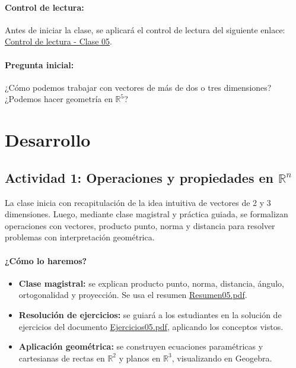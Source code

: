 \documentclass[a4,11pt]{aleph-notas}
\begin{document}
\paragraph{Control de lectura:}
Antes de iniciar la clase, se aplicará el control de lectura del siguiente enlace:
\href{https://gemini.google.com/share/240a32bed915}{Control de lectura - Clase 05}.

\paragraph{Pregunta inicial:}
¿Cómo podemos trabajar con vectores de más de dos o tres dimensiones? ¿Podemos hacer geometría en $\mathbb{R}^5$?

\section*{Desarrollo}

\subsection*{Actividad 1: Operaciones y propiedades en $\mathbb{R}^n$}

La clase inicia con recapitulación de la idea intuitiva de vectores de 2 y 3 dimensiones. Luego, mediante clase magistral y práctica guiada, se formalizan operaciones con vectores, producto punto, norma y distancia para resolver problemas con interpretación geométrica.

\paragraph{¿Cómo lo haremos?}
\begin{itemize}[leftmargin=*]
    \item \textbf{Clase magistral:} se explican producto punto, norma, distancia, ángulo, ortogonalidad y proyección. Se usa el resumen \href{https://fcena-puce.github.io/AlgebraLineal-05-N0048/01Resumen/Resumen05.pdf}{Resumen05.pdf}.
    \item \textbf{Resolución de ejercicios:} se guiará a los estudiantes en la solución de ejercicios del documento \href{https://fcena-puce.github.io/AlgebraLineal-05-N0048/04Ejercicios/Ejercicios05.pdf}{Ejercicios05.pdf}, aplicando los conceptos vistos.
    \item \textbf{Aplicación geométrica:} se construyen ecuaciones paramétricas y cartesianas de rectas en $\mathbb{R}^2$ y planos en $\mathbb{R}^3$, visualizando en Geogebra.
\end{itemize}
\end{document}
